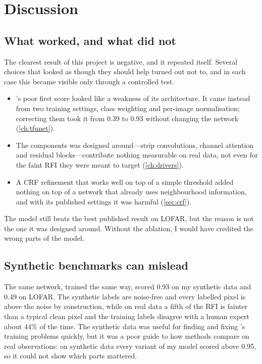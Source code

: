 \chapter{Discussion}
\label{ch:discussion}

\section{What worked, and what did not}
The clearest result of this project is negative, and it repeated itself. Several
choices that looked as though they should help turned out not to, and in each
case this became visible only through a controlled test.

\begin{itemize}
  \item \tfunet{}'s poor first score looked like a weakness of its architecture.
    It came instead from two training settings, class weighting and per-image
    normalisation; correcting them took it from 0.39 to 0.93 without changing
    the network (\cref{ch:tfunet}).
  \item The components \hybrid{} was designed around---strip convolutions,
    channel attention and residual blocks---contribute nothing measurable on
    real data, not even for the faint RFI they were meant to target
    (\cref{ch:drivers}).
  \item A CRF refinement that works well on top of a simple threshold added
    nothing on top of a network that already uses neighbourhood information,
    and with its published settings it was harmful (\cref{sec:crf}).
\end{itemize}

The model still beats the best published result on LOFAR, but the reason is
not the one it was designed around. Without the ablation, I would have
credited the wrong parts of the model.

\section{Synthetic benchmarks can mislead}
The same network, trained the same way, scored 0.93 on my synthetic data and
0.49 on LOFAR. The synthetic labels are noise-free and every labelled pixel is
above the noise by construction, while on real data a fifth of the RFI is
fainter than a typical clean pixel and the training labels disagree with a
human expert about 44\% of the time. The synthetic data was useful for finding
and fixing \tfunet{}'s training problems quickly, but it was a poor guide to
how methods compare on real observations: on synthetic data every variant of
my model scored above 0.95, so it could not show which parts mattered.

